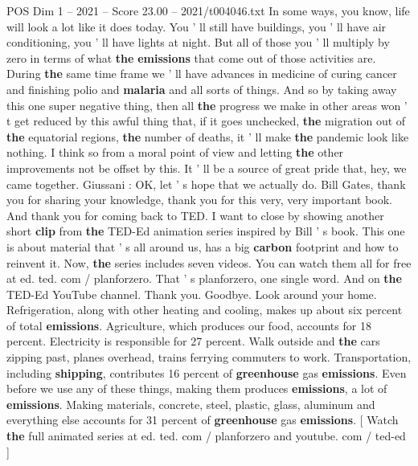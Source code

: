 \begin{textsample}{POS Dim 1 – 2021 – Score 23.00 – 2021/t004046.txt}
In some ways, you know, life will look a lot like it does today.
You ' ll still have buildings, you ' ll have air conditioning, you ' ll have lights at night.
But all of those you ' ll multiply by zero in terms of what \textbf{the} \textbf{emissions} that come out of those activities are.
During \textbf{the} same time frame we ' ll have advances in medicine of curing cancer and finishing polio and \textbf{malaria} and all sorts of things.
And so by taking away this one super negative thing, then all \textbf{the} progress we make in other areas won ' t get reduced by this awful thing that, if it goes unchecked, \textbf{the} migration out of \textbf{the} equatorial regions, \textbf{the} number of deaths, it ' ll make \textbf{the} pandemic look like nothing.
I think so from a moral point of view and letting \textbf{the} other improvements not be offset by this.
It ' ll be a source of great pride that, hey, we came together.
Giussani : OK, let ' s hope that we actually do.
Bill Gates, thank you for sharing your knowledge, thank you for this very, very important book.
And thank you for coming back to TED.
I want to close by showing another short \textbf{clip} from \textbf{the} TED-Ed animation series inspired by Bill ' s book.
This one is about material that ' s all around us, has a big \textbf{carbon} footprint and how to reinvent it.
Now, \textbf{the} series includes seven videos.
You can watch them all for free at ed. ted. com / planforzero.
That ' s planforzero, one single word.
And on \textbf{the} TED-Ed YouTube channel.
Thank you.
Goodbye.
Look around your home.
Refrigeration, along with other heating and cooling, makes up about six percent of total \textbf{emissions}.
Agriculture, which produces our food, accounts for 18 percent.
Electricity is responsible for 27 percent.
Walk outside and \textbf{the} cars zipping past, planes overhead, trains ferrying commuters to work.
Transportation, including \textbf{shipping}, contributes 16 percent of \textbf{greenhouse} gas \textbf{emissions}.
Even before we use any of these things, making them produces \textbf{emissions}, a lot of \textbf{emissions}.
Making materials, concrete, steel, plastic, glass, aluminum and everything else accounts for 31 percent of \textbf{greenhouse} gas \textbf{emissions}. [ Watch \textbf{the} full animated series at ed. ted. com / planforzero and youtube. com / ted-ed ]

\end{textsample}
